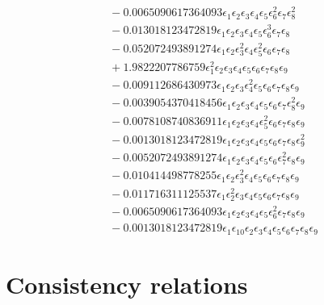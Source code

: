 \documentclass[10pt]{article}
\begin{document}
\begin{align*}
&{}  - 0.0065090617364093 \epsilon_{1} \epsilon_{2} \epsilon_{3} \epsilon_{4} \epsilon_{5} \epsilon_{6}^{2} \epsilon_{7} \epsilon_{8}^{2} \\
&{}  - 0.013018123472819 \epsilon_{1} \epsilon_{2} \epsilon_{3} \epsilon_{4} \epsilon_{5} \epsilon_{6}^{3} \epsilon_{7} \epsilon_{8} \\
&{}  - 0.052072493891274 \epsilon_{1} \epsilon_{2} \epsilon_{3}^{2} \epsilon_{4} \epsilon_{5}^{2} \epsilon_{6} \epsilon_{7} \epsilon_{8} \\
&{}  + 1.9822207786759 \epsilon_{1}^{2} \epsilon_{2} \epsilon_{3} \epsilon_{4} \epsilon_{5} \epsilon_{6} \epsilon_{7} \epsilon_{8} \epsilon_{9} \\
&{}  - 0.009112686430973 \epsilon_{1} \epsilon_{2} \epsilon_{3} \epsilon_{4}^{2} \epsilon_{5} \epsilon_{6} \epsilon_{7} \epsilon_{8} \epsilon_{9} \\
&{}  - 0.0039054370418456 \epsilon_{1} \epsilon_{2} \epsilon_{3} \epsilon_{4} \epsilon_{5} \epsilon_{6} \epsilon_{7} \epsilon_{8}^{2} \epsilon_{9} \\
&{}  - 0.0078108740836911 \epsilon_{1} \epsilon_{2} \epsilon_{3} \epsilon_{4} \epsilon_{5}^{2} \epsilon_{6} \epsilon_{7} \epsilon_{8} \epsilon_{9} \\
&{}  - 0.0013018123472819 \epsilon_{1} \epsilon_{2} \epsilon_{3} \epsilon_{4} \epsilon_{5} \epsilon_{6} \epsilon_{7} \epsilon_{8} \epsilon_{9}^{2} \\
&{}  - 0.0052072493891274 \epsilon_{1} \epsilon_{2} \epsilon_{3} \epsilon_{4} \epsilon_{5} \epsilon_{6} \epsilon_{7}^{2} \epsilon_{8} \epsilon_{9} \\
&{}  - 0.010414498778255 \epsilon_{1} \epsilon_{2} \epsilon_{3}^{2} \epsilon_{4} \epsilon_{5} \epsilon_{6} \epsilon_{7} \epsilon_{8} \epsilon_{9} \\
&{}  - 0.011716311125537 \epsilon_{1} \epsilon_{2}^{2} \epsilon_{3} \epsilon_{4} \epsilon_{5} \epsilon_{6} \epsilon_{7} \epsilon_{8} \epsilon_{9} \\
&{}  - 0.0065090617364093 \epsilon_{1} \epsilon_{2} \epsilon_{3} \epsilon_{4} \epsilon_{5} \epsilon_{6}^{2} \epsilon_{7} \epsilon_{8} \epsilon_{9} \\
&{}  - 0.0013018123472819 \epsilon_{1} \epsilon_{10} \epsilon_{2} \epsilon_{3} \epsilon_{4} \epsilon_{5} \epsilon_{6} \epsilon_{7} \epsilon_{8} \epsilon_{9}
\end{align*}

\section{Consistency relations}
\end{document}

